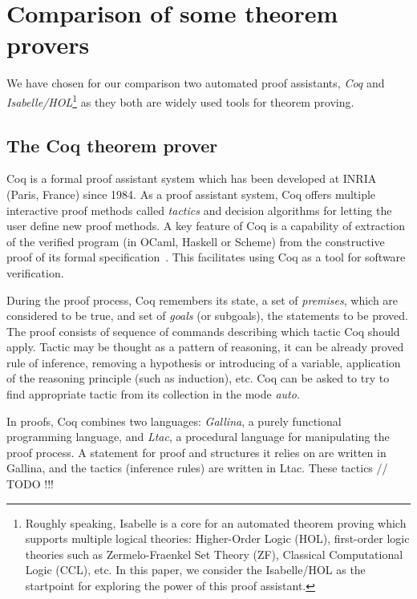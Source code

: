 \documentclass[article]{aaltoseries}
\begin{document}
\section{Comparison of some theorem provers}
\label{sec:comparison}

We have chosen for our comparison two automated proof assistants, \textit{Coq} and \textit{Isabelle/HOL}\footnote{Roughly speaking, Isabelle is a core for an automated theorem proving which supports multiple logical theories: Higher-Order Logic (HOL), first-order logic theories such as Zermelo-Fraenkel Set Theory (ZF), Classical Computational Logic (CCL), etc. In this paper, we consider the Isabelle/HOL as the startpoint for exploring the power of this proof assistant.} as they both are widely used tools for theorem proving.



\subsection{The Coq theorem prover}
\label{sec:prover_coq}

Coq is a formal proof assistant system which has been developed at INRIA (Paris, France) since 1984. As a proof assistant system, Coq offers multiple interactive proof methods called \textit{tactics} and decision algorithms for letting the user define new proof methods. A key feature of Coq is a capability of extraction of the verified program (in OCaml, Haskell or Scheme) from the constructive proof of its formal specification~\cite{tool_Coq}. This facilitates using Coq as a tool for software verification.

During the proof process, Coq remembers its state, a set of \textit{premises}, which are considered to be true, and set of \textit{goals} (or subgoals), the statements to be proved. The proof consists of sequence of commands describing which tactic Coq should apply. Tactic may be thought as a pattern of reasoning, it can be already proved rule of inference, removing a hypothesis or introducing of a variable, application of the reasoning principle (such as induction), etc. Coq can be asked to try to find appropriate tactic from its collection in the mode \textit{auto}.

In proofs, Coq combines two languages: \textit{Gallina}, a purely functional programming language, and \textit{Ltac}, a procedural language for manipulating the proof process. A statement for proof and structures it relies on are written in Gallina, and the tactics (inference rules) are written in Ltac. These tactics  // TODO !!! %
\end{document}
